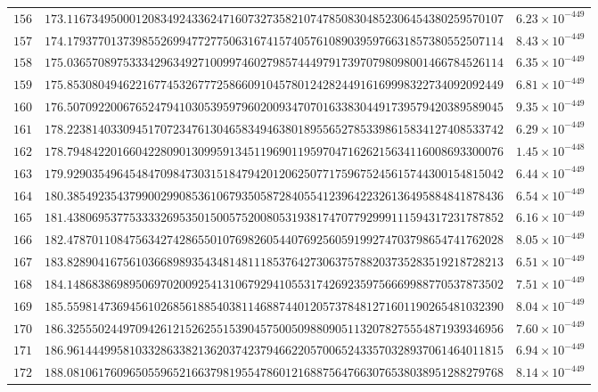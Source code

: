 \documentclass[12pt,reqno]{amsart}
\theoremstyle{remark}
\begin{document}
\begin{longtable}{clc}
$156$ & $173.1167349500012083492433624716073273582107478508304852306454380259570107$ & $6.23\times 10^{-449}$ \\
$157$ & $174.1793770137398552699477277506316741574057610890395976631857380552507114$ & $8.43\times 10^{-449}$ \\
$158$ & $175.0365708975333429634927100997460279857444979173970798098001466784526114$ & $6.35\times 10^{-449}$ \\
$159$ & $175.8530804946221677453267772586609104578012428244916169998322734092092449$ & $6.81\times 10^{-449}$ \\
$160$ & $176.5070922006765247941030539597960200934707016338304491739579420389589045$ & $9.35\times 10^{-449}$ \\
$161$ & $178.2238140330945170723476130465834946380189556527853398615834127408533742$ & $6.29\times 10^{-449}$ \\
$162$ & $178.7948422016604228090130995913451196901195970471626215634116008693300076$ & $1.45\times 10^{-448}$ \\
$163$ & $179.9290354964548470984730315184794201206250771759675245615744300154815042$ & $6.44\times 10^{-449}$ \\
$164$ & $180.3854923543799002990853610679350587284055412396422326136495884841878436$ & $6.54\times 10^{-449}$ \\
$165$ & $181.4380695377533332695350150057520080531938174707792999111594317231787852$ & $6.16\times 10^{-449}$ \\
$166$ & $182.4787011084756342742865501076982605440769256059199274703798654741762028$ & $8.05\times 10^{-449}$ \\
$167$ & $183.8289041675610366898935434814811185376427306375788203735283519218728213$ & $6.51\times 10^{-449}$ \\
$168$ & $184.1486838698950697020092541310679294105531742692359756669988770537873502$ & $7.51\times 10^{-449}$ \\
$169$ & $185.5598147369456102685618854038114688744012057378481271601190265481032390$ & $8.04\times 10^{-449}$ \\
$170$ & $186.3255502449709426121526255153904575005098809051132078275554871939346956$ & $7.60\times 10^{-449}$ \\
$171$ & $186.9614449958103328633821362037423794662205700652433570328937061464011815$ & $6.94\times 10^{-449}$ \\
$172$ & $188.0810617609650559652166379819554786012168875647663076538038951288279768$ & $8.14\times 10^{-449}$ \\

\end{longtable}
\end{document}
